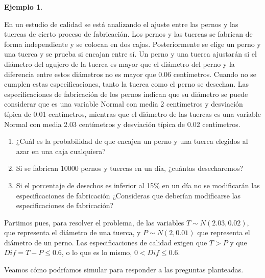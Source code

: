 \documentclass[
]{book}
\providecommand{\tightlist}{%
  \setlength{\itemsep}{0pt}\setlength{\parskip}{0pt}}
\theoremstyle{definition}
\theoremstyle{definition}
\newtheorem{example}{Ejemplo}[chapter]
\theoremstyle{definition}
\theoremstyle{definition}
\theoremstyle{remark}
\begin{document}
\begin{example}
\protect\hypertarget{exm:combined2}{}\label{exm:combined2}

En un estudio de calidad se está analizando el ajuste entre las pernos y las tuercas de cierto proceso de fabricación. Los pernos y las tuercas se fabrican de forma independiente y se colocan en dos cajas. Posteriormente se elige un perno y una tuerca y se prueba si encajan entre sí. Un perno y una tuerca ajustarán si el diámetro del agujero de la tuerca es mayor que el diámetro del perno y la diferencia entre estos diámetros no es mayor que 0.06 centímetros. Cuando no se cumplen estas especificaciones, tanto la tuerca como el perno se desechan. Las especificaciones de fabricación de los pernos indican que su diámetro se puede considerar que es una variable Normal con media 2 centimetros y desviación típica de 0.01 centímetros, mientras que el diámetro de las tuercas es una variable Normal con media 2.03 centímetros y desviación típica de 0.02 centímetros.

\begin{enumerate}
\def\labelenumi{\arabic{enumi}.}
\tightlist
\item
  ¿Cuál es la probabilidad de que encajen un perno y una tuerca elegidos al azar en una caja cualquiera?
\item
  Si se fabrican 10000 pernos y tuercas en un día, ¿cuántas desecharemos?
\item
  Si el porcentaje de desechos es inferior al 15\% en un día no se modificarán las especificaciones de fabricación ¿Consideras que deberían modificarse las especificaciones de fabricación?
\end{enumerate}

\end{example}

Partimos pues, para resolver el problema, de las variables \(T\sim N(2.03, 0.02)\), que representa el diámetro de una tuerca, y \(P \sim N(2, 0.01)\) que representa el diámetro de un perno. Las especificaciones de calidad exigen que \(T>P\) y que \(Dif=T-P\leq 0.6\), o lo que es lo mismo, \(0<Dif\leq 0.6\).

Veamos cómo podríamos simular para responder a las preguntas planteadas.
\end{document}
